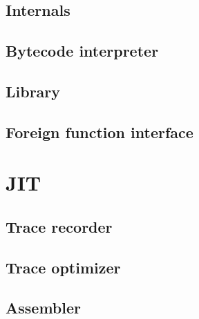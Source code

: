 \documentclass[12pt, oneside]{Thesis}
\begin{document}
    \section{Internals}
    \label{Sec:Internals}
    

    \section{Bytecode interpreter}
    \label{Sec:BI}
    

    \section{Library}
    \label{Sec:Library}
    

    \section{Foreign function interface}
    \label{Sec:FFI}
    

  \chapter{JIT}
  \label{Chapt:JIT}

    \section{Trace recorder}
    \label{Sec:TR}
    

    \section{Trace optimizer}
    \label{Sec:TO}
    

    \section{Assembler}
    \label{Sec:TA}
    
\clearpage
{}
\appendix
\baselineskip=16pt
\end{document}
